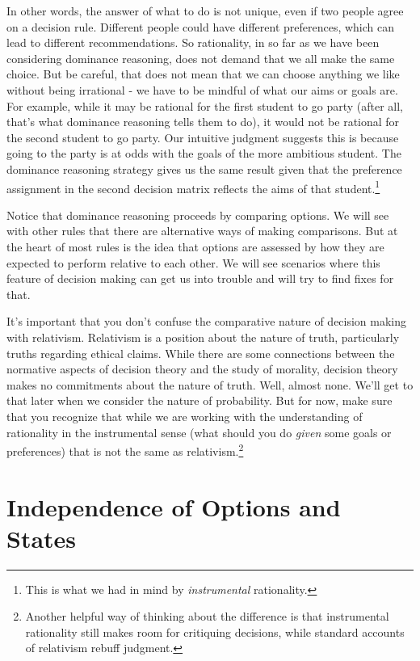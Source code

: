 \documentclass[]{tufte-book}
\begin{document}
In other words, the answer of what to do is not unique, even if two people agree on a decision rule. Different people could have different preferences, which can lead to different recommendations. So rationality, in so far as we have been considering dominance reasoning, does not demand that we all make the same choice. But be careful, that does not mean that we can choose anything we like without being irrational - we have to be mindful of what our aims or goals are. For example, while it may be rational for the first student to go party (after all, that's what dominance reasoning tells them to do), it would not be rational for the second student to go party. Our intuitive judgment suggests this is because going to the party is at odds with the goals of the more ambitious student. The dominance reasoning strategy gives us the same result given that the preference assignment in the second decision matrix reflects the aims of that student.\footnote{This is what we had in mind by \emph{instrumental} rationality.}

Notice that dominance reasoning proceeds by comparing options. We will see with other rules that there are alternative ways of making comparisons. But at the heart of most rules is the idea that options are assessed by how they are expected to perform relative to each other. We will see scenarios where this feature of decision making can get us into trouble and will try to find fixes for that.

It's important that you don't confuse the comparative nature of decision making with relativism. Relativism is a position about the nature of truth, particularly truths regarding ethical claims. While there are some connections between the normative aspects of decision theory and the study of morality, decision theory makes no commitments about the nature of truth. Well, almost none. We'll get to that later when we consider the nature of probability. But for now, make sure that you recognize that while we are working with the understanding of rationality in the instrumental sense (what should you do \emph{given} some goals or preferences) that is not the same as relativism.\footnote{Another helpful way of thinking about the difference is that instrumental rationality still makes room for critiquing decisions, while standard accounts of relativism rebuff judgment.}

\hypertarget{independence-of-options-and-states}{%
\section{Independence of Options and States}\label{independence-of-options-and-states}}
\end{document}
